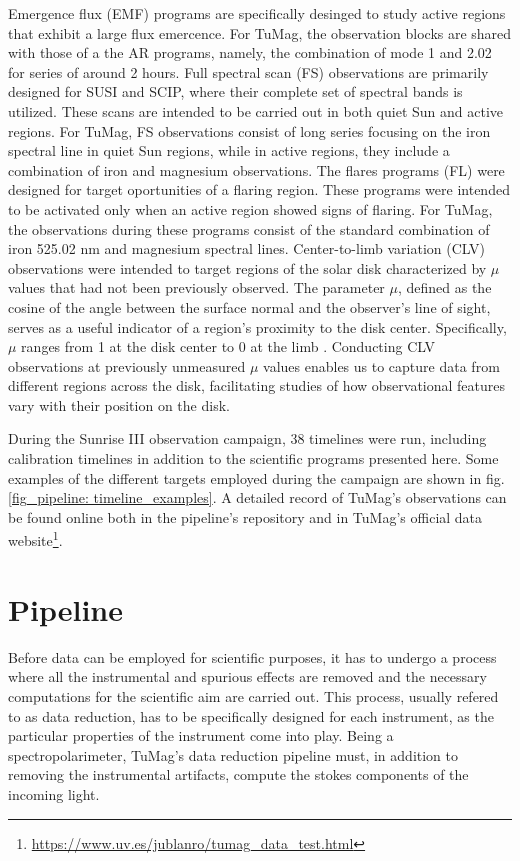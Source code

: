 \begin{itemize}
  \Myitem Emergence flux (EMF) programs are specifically desinged to study active regions that exhibit a large flux emercence. For TuMag, the observation blocks are shared with those of a the AR programs, namely, the combination of mode 1 and 2.02 for series of around 2 hours. 
  \Myitem Full spectral scan (FS) observations are primarily designed for SUSI and SCIP, where their complete set of spectral bands is utilized. These scans are intended to be carried out in both quiet Sun and active regions. For TuMag, FS observations consist of long series focusing on the iron spectral line in quiet Sun regions, while in active regions, they include a combination of iron and magnesium observations.
  \Myitem The flares programs (FL) were designed for target oportunities of a flaring region. These programs were intended to be activated only when an active region showed signs of flaring. For TuMag, the observations during these programs consist of the standard combination of iron 525.02 nm and magnesium spectral lines.
  \Myitem Center-to-limb variation (CLV) observations were intended to target regions of the solar disk characterized by $\mu$ values that had not been previously observed. The parameter $\mu$, defined as the cosine of the angle between the surface normal and the observer's line of sight, serves as a useful indicator of a region's proximity to the disk center. Specifically, $\mu$ ranges from 1 at the disk center to 0 at the limb \citep{thompson2006coordinate}. Conducting CLV observations at previously unmeasured $\mu$ values enables us to capture data from different regions across the disk, facilitating studies of how observational features vary with their position on the disk. 
\end{itemize}

During the Sunrise III observation campaign, 38 timelines were run, including calibration timelines in addition to the scientific programs presented here. Some examples of the different targets employed during the campaign are shown in fig. \ref{fig_pipeline: timeline_examples}.  A detailed record of TuMag's observations can be found online both in the pipeline's repository and in TuMag's official data website\footnote{\url{https://www.uv.es/jublanro/tumag_data_test.html}}.  

\section{Pipeline}

Before data can be employed for scientific purposes, it has to undergo a process where all the instrumental and spurious effects are removed and the necessary computations for the scientific aim are carried out. This process, usually refered to as data reduction, has to be specifically designed for each instrument, as the particular properties of the instrument come into play. Being a spectropolarimeter, TuMag's data reduction pipeline must, in addition to removing the instrumental artifacts, compute the stokes components of the incoming light.

